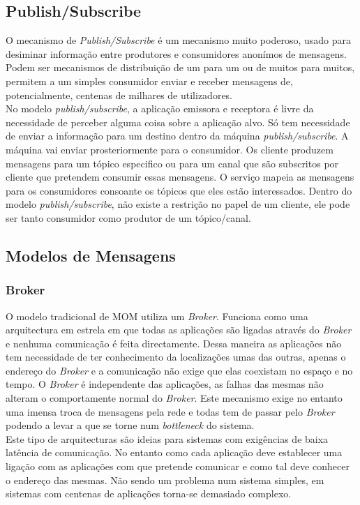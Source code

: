 \subsection{Publish/Subscribe}
O mecanismo  de \textit{Publish/Subscribe} é um mecanismo muito poderoso, usado para desiminar informação entre produtores e consumidores anonímos de mensagens. Podem ser mecanismos de distribuição de um para um ou de muitos para muitos, permitem a um simples consumidor enviar e receber mensagens de, potencialmente, centenas de milhares de utilizadores.\\
No modelo \textit{publish/subscribe}, a aplicação emissora e receptora é livre da necessidade de perceber alguma coisa sobre a aplicação alvo.  Só tem necessidade de enviar a informação para um destino dentro da máquina \textit{publish/subscribe}. A máquina vai enviar prosteriormente para o consumidor. Os cliente produzem mensagens para um tópico especifico ou para um canal que são subscritos por cliente que pretendem consumir essas mensagens. O serviço mapeia as mensagens para os consumidores consoante os tópicos que eles estão interessados. Dentro do modelo \textit{publish/subscribe}, não existe a restrição no papel de um cliente, ele pode ser tanto consumidor como produtor de um tópico/canal.\\
\subsection{Modelos de Mensagens}
\subsubsection{Broker}
O modelo tradicional de MOM utiliza um \textit{Broker}. Funciona como uma arquitectura em estrela em que todas as aplicações são ligadas através do \textit{Broker} e nenhuma comunicação é feita directamente. Dessa maneira as aplicações não tem necessidade de ter conhecimento da localizações umas das outras, apenas o endereço do \textit{Broker} e a comunicação não exige que elas coexistam no espaço e no tempo. O \textit{Broker} é independente das aplicações, as falhas das mesmas não alteram o comportamente normal do \textit{Broker}. Este mecanismo exige no entanto uma imensa troca de mensagens pela rede e todas tem de passar pelo \textit{Broker} podendo a levar a que se torne num \textit{bottleneck} do sistema.\\
Este tipo de arquitecturas são ideias para sistemas com exigências de baixa latência de comunicação. No entanto como cada aplicação deve establecer uma ligação com as aplicações com que pretende comunicar e como tal deve conhecer o endereço das mesmas. Não sendo um problema num sistema simples, em sistemas com centenas de aplicações torna-se demasiado complexo.\\
